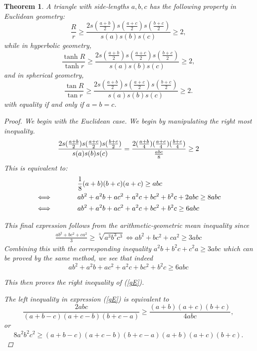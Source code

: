 \documentclass[12pt,notitlepage]{amsart}%
\newtheorem{theorem}{Theorem}[section]
\begin{document}
\begin{theorem}\label{generalized}
	A triangle with side-lengths $a,b,c$ has the following property in Euclidean geometry:
	\begin{equation} 
    	\label{gE}\frac{R}{r}\geq \frac{2s(\frac{a+b}{2})s(\frac{a+c}{2})s(\frac{b+c}{2})}{s(a)s(b)s(c)}\geq 2,
    \end{equation}
	while in hyperbolic geometry, 
	\begin{equation} 
    	\label{gH}\frac{\tanh R}{\tanh r}\geq \frac{2s(\frac{a+b}{2})s(\frac{a+c}{2})s(\frac{b+c}{2})}{s(a)s(b)s(c)}\geq 2,
    \end{equation}
	and in spherical geometry,
	\begin{equation} 
    	\label{gS}\frac{\tan R}{\tan r}\geq \frac{2s(\frac{a+b}{2})s(\frac{a+c}{2})s(\frac{b+c}{2})}{s(a)s(b)s(c)}\geq 2.
    \end{equation}
    with equality if and only if $a=b=c$.
	\begin{proof}
   	We begin with the Euclidean case.
    We begin by manipulating the right most inequality.
    \begin{equation*}
    \frac{2s(\frac{a+b}{2})s(\frac{a+c}{2})s(\frac{b+c}{2})}{s(a)s(b)s(c)} = \frac{2 (\frac{a+b}{4})(\frac{a+c}{4})(\frac{b+c}{4})}{\frac{abc}{8}} \geq 2\\ 
    \end{equation*}
    This is equivalent to:
    \begin{align*}
     &\frac{1}{8}(a+b)(b+c)(a+c) \geq abc \\ 
\iff \hspace*{.5in}      &ab^2+a^2b+ac^2+a^2c+bc^2+b^2c + 2abc \geq 8abc \\
\iff  \hspace*{.5in}	 &ab^2+a^2b+ac^2+a^2c+bc^2+b^2c \geq 6abc
    \end{align*}
    
    This final expression follows from the arithmetic-geometric mean inequality since 
    \begin{align*}
    \frac{ab^2+bc^2+ca^2}{3} \geq \sqrt[3]{a^3b^3c^3}
    \iff ab^2+bc^2+ca^2 \geq 3abc
    \end{align*}
    Combining this with the corresponding inequality $a^2b+b^2c+c^2a \geq 3abc$ which can be proved by the same method, we see that indeed 
    \[ ab^2+a^2b+ac^2+a^2c+bc^2+b^2c \geq 6abc \]
    
    This then proves the right inequality of (\ref{gE}).
    
    The left inequality in expression (\ref{gE}) is equivalent to
    \[\frac{2abc}{(a+b-c)(a+c-b)(b+c-a)}\geq \frac{(a+b)(a+c)(b+c)}{4abc},\]
    or
    \[8a^2b^2c^2\geq(a+b-c)(a+c-b)(b+c-a)(a+b)(a+c)(b+c).\]
    

\end{proof}
\end{theorem}
\end{document}
